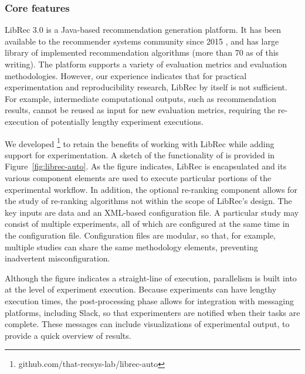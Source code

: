 \subsubsection{\textbf{Core features}}
\hfill

LibRec 3.0 is a Java-based recommendation generation platform. It has been available to the recommender systems community since 2015 \cite{guo2015librec}, and has large library of implemented recommendation algorithms (more than 70 as of this writing). The platform supports a variety of evaluation metrics and evaluation methodologies. However, our experience indicates that for practical experimentation and reproducibility research, LibRec by itself is not sufficient. For example, intermediate computational outputs, such as recommendation results, cannot be reused as input for new evaluation metrics, requiring the re-execution of potentially lengthy experiment executions.

We developed \libauto{}\footnote{github.com/that-recsys-lab/librec-auto} to retain the benefits of working with LibRec while adding support for experimentation. A sketch of the functionality of \libauto{} is provided in Figure~\ref{fig:librec-auto}. As the figure indicates, LibRec is encapsulated and its various component elements are used to execute particular portions of the experimental workflow. In addition, the optional re-ranking component allows for the study of re-ranking algorithms not within the scope of LibRec's design. The key inputs are data and an XML-based configuration file. A particular study may consist of multiple experiments, all of which are configured at the same time in the configuration file. Configuration files are modular, so that, for example, multiple studies can share the same methodology elements, preventing inadvertent misconfiguration. 

Although the figure indicates a straight-line of execution, parallelism is built into \libauto{} at the level of experiment execution. Because experiments can have lengthy execution times, the post-processing phase allows for integration with messaging platforms, including Slack, so that experimenters are notified when their tasks are complete. These messages can include visualizations of experimental output, to provide a quick overview of results. 

